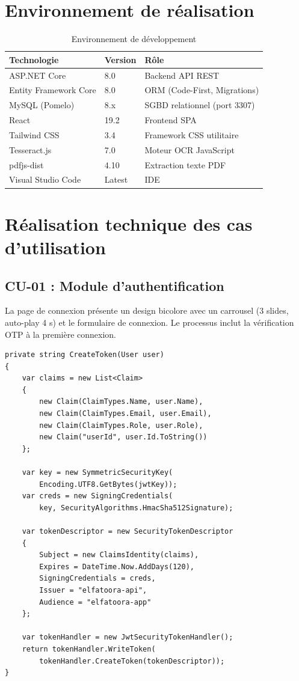 \documentclass[a4paper,12pt]{report}
\begin{document}
\section{Environnement de réalisation}

\begin{table}[htbp]
\centering
\caption{Environnement de développement}
\begin{tabularx}{\textwidth}{|l|l|X|}
\hline
\textbf{Technologie} & \textbf{Version} & \textbf{Rôle} \\
\hline
ASP.NET Core & 8.0 & Backend API REST \\
\hline
Entity Framework Core & 8.0 & ORM (Code-First, Migrations) \\
\hline
MySQL (Pomelo) & 8.x & SGBD relationnel (port 3307) \\
\hline
React & 19.2 & Frontend SPA \\
\hline
Tailwind CSS & 3.4 & Framework CSS utilitaire \\
\hline
Tesseract.js & 7.0 & Moteur OCR JavaScript \\
\hline
pdfjs-dist & 4.10 & Extraction texte PDF \\
\hline
Visual Studio Code & Latest & IDE \\
\hline
\end{tabularx}
\end{table}

\section{Réalisation technique des cas d'utilisation}

\subsection{CU-01 : Module d'authentification}

La page de connexion présente un design bicolore avec un carrousel (3 slides, auto-play 4 s) et le formulaire de connexion. Le processus inclut la vérification OTP à la première connexion.

\begin{lstlisting}[language={[Sharp]C}, caption={Génération du token JWT (AuthController.cs)}]
private string CreateToken(User user)
{
    var claims = new List<Claim>
    {
        new Claim(ClaimTypes.Name, user.Name),
        new Claim(ClaimTypes.Email, user.Email),
        new Claim(ClaimTypes.Role, user.Role),
        new Claim("userId", user.Id.ToString())
    };

    var key = new SymmetricSecurityKey(
        Encoding.UTF8.GetBytes(jwtKey));
    var creds = new SigningCredentials(
        key, SecurityAlgorithms.HmacSha512Signature);

    var tokenDescriptor = new SecurityTokenDescriptor
    {
        Subject = new ClaimsIdentity(claims),
        Expires = DateTime.Now.AddDays(120),
        SigningCredentials = creds,
        Issuer = "elfatoora-api",
        Audience = "elfatoora-app"
    };

    var tokenHandler = new JwtSecurityTokenHandler();
    return tokenHandler.WriteToken(
        tokenHandler.CreateToken(tokenDescriptor));
}
\end{lstlisting}
\end{document}
